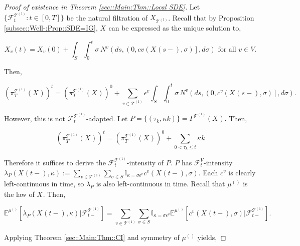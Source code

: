 \documentclass[12pt]{article}
\newcommand{\mb}{\mathbb}
\newcommand{\mc}{\mathcal}
\newcommand{\te}{\text}
\newcommand{\ep}{\epsilon}
\newcommand{\exmu}[2]{\mb{E}^{#1}\left[#2\right]}	%
\renewcommand{\v}{v}							%
\renewcommand{\S}{S}							%
\newcommand{\s}{\sigma}							%
\newcommand{\ev}{\ep}							%
\newcommand{\T}{T}								%
\renewcommand{\t}{t}							%
\newcommand{\proj}{\pi}							%
\renewcommand{\tt}{s}							%
\newcommand{\F}{\mc{F}}							%
\newcommand{\X}{X}								%
\newcommand{\IGr}{c}							%
\newcommand{\vind}[1]{^{#1}}					%
\newcommand{\vsi}[1]{^{#1}}						%
\newcommand{\cind}[1]{_{#1}}					%
\newcommand{\tp}[1]{(#1)}						%
\newcommand{\tip}[1]{#1}						%
\newcommand{\ts}[1]{_{#1}}						%
\newcommand{\tree}{\mc{T}}						%
\newcommand{\sln}[1]{^{(#1)}}					%
\newcommand{\poiss}{N}							%
\newcommand{\rate}{\lambda}						%
\newcommand{\pra}[1]{_{#1}}						%
\newcommand{\indx}[1]{_{#1}}					%
\newcommand{\m}{\mu}							%
\newcommand{\rt}{\tau}							%
\renewcommand{\it}{k}							%
\newcommand{\pmap}{\Gamma}						%
\renewcommand{\mark}{\kappa}					%
\newcommand{\rp}{P}								%
\begin{document}
\begin{proof}[Proof of existence in Theorem \ref{sec::Main:Thm::Local SDE}]

Let \(\{\F\vsi{\tree\sln{1}}\ts{\t}:\t\in [0,\T]\}\) be the natural filtration of \(\X\cind{\tree\sln{1}}\tip{}\). Recall that by Proposition \ref{subsec::Well-:Prop::SDE=IG}, \(\X\cind{}\tip{}\) can be expressed as the unique solution to,

\[\X\cind{\v}\tp{\t} = \X\cind{\v}\tp{0} + \int_\S\int_0^\t \s\,\poiss\vind{\v}\left(d\tt,\left(0,c{\v}(\X\cind{}\tp{\tt-},\s)\right],d\s\right) \te{ for all } \v \in V.\]

Then,

\[\left(\proj\vsi{\tree\sln{1}}\ts{\T}(\X\cind{}\tip{})\right)^\t = \left(\proj\vsi{\tree\sln{1}}\ts{\T}(\X\cind{}\tip{})\right)^0 + \sum_{\v \in \tree\sln{1}}\ev\vind{\v}\int_\S\int_0^\t \s\,\poiss\vind{\v}\left(d\tt,\left(0,\IGr\vind{\v}(\X\cind{}\tp{\tt-},\s)\right],d\s\right).\]

However, this is not \(\F\vsi{\tree\sln{1}}\ts{\t}\)-adapted. Let \(\rp = \{(\rt\indx{\it},\mark{\it})\} = \pmap\vind{\tree\sln{1}}(\X\cind{}\tip{}).\) Then,

\[\left(\proj\vsi{\tree\sln{1}}\ts{\T}(\X\cind{}\tip{})\right)^\t = \left(\proj\vsi{\tree\sln{1}}\ts{\T}(\X\cind{}\tip{})\right)^0 + \sum_{0 < \rt\indx{\it} \leq \t}\mark{\it}\]

Therefore it suffices to derive the \(\F\vsi{\tree\sln{1}}\ts{\t}\)-intensity of \(\rp\). \(\rp\) has \(\F\vsi{V}\ts{\t}\)-intensity \(\rate\pra{\rp}(\X\cind{}\tp{\t-},\mark{}) := \sum_{\v \in \tree\sln{1}}\sum_{\s\in \S}\mb{I}_{\mark{} = \s\ev\vind{\v}}\IGr\vind{\v}(\X\cind{}\tp{\t-},\s)\). Each \(\IGr\vind{\v}\) is clearly left-continuous in time, so \(\rate\pra{\rp}\) is also left-continuous in time. Recall that \(\m\sln{}\ts{}\) is the law of \(\X\cind{}\tip{}\). Then,

\[\exmu{\m\sln{}\ts{}}{\rate\pra{\rp}(\X\cind{}\tp{\t-},\mark{})|\F\vsi{\tree\sln{1}}\ts{\t-}} = \sum_{\v \in \tree\sln{1}}\sum_{\s\in \S} \mb{I}_{\mark{} = \s\ev\vind{\v}}\exmu{\m\sln{}\ts{}}{\IGr\vind{\v}(\X\cind{}\tp{\t-},\s)|\F\vsi{\tree\sln{1}}\ts{\t-}}.\]

Applying Theorem \ref{sec::Main:Thm::CI} and symmetry of \(\m\sln{}\ts{}\) yields,


\end{proof}
\end{document}
